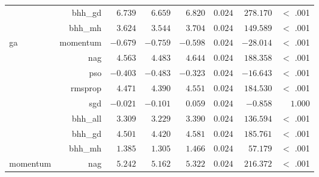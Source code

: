 \begin{table}[htbp]
{\begin{tabular}{lrrrrrrr}
			                     & bhh\_gd              & $6.739$              & $6.659$                                         & $6.820$              & $0.024$              & $278.170$            & $<$ .001    \\
			                     & bhh\_mh              & $3.624$              & $3.544$                                         & $3.704$              & $0.024$              & $149.589$            & $<$ .001    \\
			ga                   & momentum             & $-0.679$             & $-0.759$                                        & $-0.598$             & $0.024$              & $-28.014$            & $<$ .001    \\
			$ $                  & nag                  & $4.563$              & $4.483$                                         & $4.644$              & $0.024$              & $188.358$            & $<$ .001    \\
			                     & pso                  & $-0.403$             & $-0.483$                                        & $-0.323$             & $0.024$              & $-16.643$            & $<$ .001    \\
			                     & rmsprop              & $4.471$              & $4.390$                                         & $4.551$              & $0.024$              & $184.530$            & $<$ .001    \\
			                     & sgd                  & $-0.021$             & $-0.101$                                        & $0.059$              & $0.024$              & $-0.858$             & $1.000$     \\
			                     & bhh\_all             & $3.309$              & $3.229$                                         & $3.390$              & $0.024$              & $136.594$            & $<$ .001    \\
			                     & bhh\_gd              & $4.501$              & $4.420$                                         & $4.581$              & $0.024$              & $185.761$            & $<$ .001    \\
			                     & bhh\_mh              & $1.385$              & $1.305$                                         & $1.466$              & $0.024$              & $57.179$             & $<$ .001    \\
			momentum             & nag                  & $5.242$              & $5.162$                                         & $5.322$              & $0.024$              & $216.372$            & $<$ .001    \\

\end{tabular}}
\end{table}
